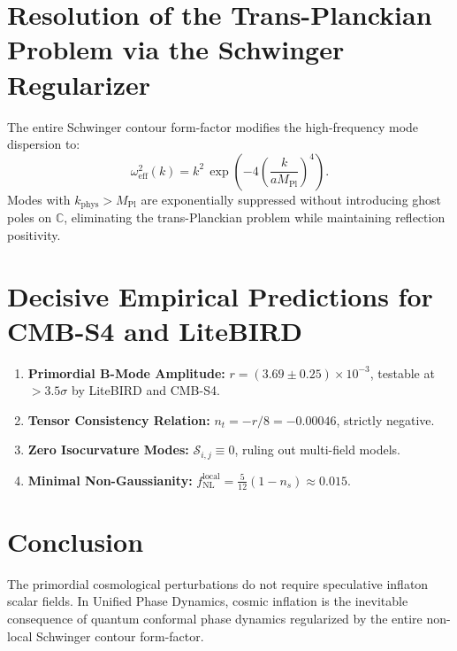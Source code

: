 \documentclass[11pt,a4paper]{article}
\begin{document}
\section{Resolution of the Trans-Planckian Problem via the Schwinger Regularizer}
The entire Schwinger contour form-factor modifies the high-frequency mode dispersion to:
\begin{equation}
\omega_{\mathrm{eff}}^2(k) = k^2 \, \exp\left( -4 \left(\frac{k}{a M_{\mathrm{Pl}}}\right)^4 \right).
\end{equation}
Modes with $k_{\mathrm{phys}} > M_{\mathrm{Pl}}$ are exponentially suppressed without introducing ghost poles on $\mathbb{C}$, eliminating the trans-Planckian problem while maintaining reflection positivity.

\section{Decisive Empirical Predictions for CMB-S4 and LiteBIRD}
\begin{enumerate}
    \item \textbf{Primordial B-Mode Amplitude:} $r = (3.69 \pm 0.25) \times 10^{-3}$, testable at $>3.5\sigma$ by LiteBIRD and CMB-S4.
    \item \textbf{Tensor Consistency Relation:} $n_t = -r/8 = -0.00046$, strictly negative.
    \item \textbf{Zero Isocurvature Modes:} $\mathcal{S}_{i,j} \equiv 0$, ruling out multi-field models.
    \item \textbf{Minimal Non-Gaussianity:} $f_{\mathrm{NL}}^{\mathrm{local}} = \frac{5}{12}(1 - n_s) \approx 0.015$.
\end{enumerate}

\section{Conclusion}
The primordial cosmological perturbations do not require speculative inflaton scalar fields. In Unified Phase Dynamics, cosmic inflation is the inevitable consequence of quantum conformal phase dynamics regularized by the entire non-local Schwinger contour form-factor.
\end{document}
